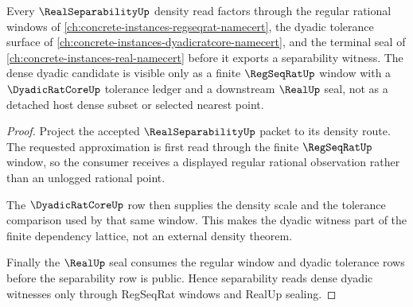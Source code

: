 \begin{theorem}
\label{thm:real-separability-dyadic-density-dependency}
Every $\RealSeparabilityUp$ density read factors through the regular rational windows of \autoref{ch:concrete-instances-regseqrat-namecert}, the dyadic tolerance surface of \autoref{ch:concrete-instances-dyadicratcore-namecert}, and the terminal seal of \autoref{ch:concrete-instances-real-namecert} before it exports a separability witness. The dense dyadic candidate is visible only as a finite $\RegSeqRatUp$ window with a $\DyadicRatCoreUp$ tolerance ledger and a downstream $\RealUp$ seal, not as a detached host dense subset or selected nearest point.
\end{theorem}
\begin{proof}
Project the accepted $\RealSeparabilityUp$ packet to its density route. The requested approximation is first read through the finite $\RegSeqRatUp$ window, so the consumer receives a displayed regular rational observation rather than an unlogged rational point.

The $\DyadicRatCoreUp$ row then supplies the density scale and the tolerance comparison used by that same window. This makes the dyadic witness part of the finite dependency lattice, not an external density theorem.

Finally the $\RealUp$ seal consumes the regular window and dyadic tolerance rows before the separability row is public. Hence separability reads dense dyadic witnesses only through RegSeqRat windows and RealUp sealing.
\end{proof}
